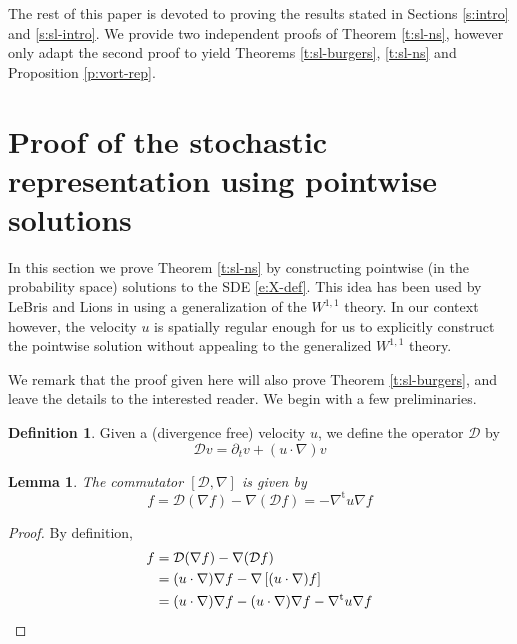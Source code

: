 \documentclass[final]{amsart}%
\newcommand{\del}{\partial}
\newcommand{\transpose}{^\text{t}}
\newcommand{\grad}{\nabla}
\newcommand{\gradt}{\grad\transpose}
\newcommand{\Dzero}[2][u]{\del_t #2 + \left(#1 \cdot \grad\right) #2}
\newcommand{\Dop}{\mathcal{D}}
\numberwithin{equation}{section}
\newtheorem{lemma}[theorem]{Lemma}
\theoremstyle{definition}
\newtheorem{defn}[theorem]{Definition}
\theoremstyle{remark}
\begin{document}
The rest of this paper is devoted to proving the results stated in Sections \ref{s:intro} and \ref{s:sl-intro}. We provide two independent proofs of Theorem \ref{t:sl-ns}, however only adapt the second proof to yield Theorems \ref{t:sl-burgers}, \ref{t:sl-ns} and Proposition \ref{p:vort-rep}.

\section{Proof of the stochastic representation using pointwise solutions}\label{s:ode-proof}%

In this section we prove Theorem \ref{t:sl-ns} by constructing pointwise (in the probability space) solutions to the SDE \eqref{e:X-def}. This idea has been used by LeBris and Lions in \cite{lebris} using a generalization of the $W^{1,1}$ theory. In our context however, the velocity $u$ is spatially regular enough for us to explicitly construct the pointwise solution without appealing to the generalized $W^{1,1}$ theory.

We remark that the proof given here will also prove Theorem \ref{t:sl-burgers}, and leave the details to the interested reader. We begin with a few preliminaries.

\begin{defn}%
Given a (divergence free) velocity $u$, we define the operator $\Dop$ by
\begin{equation*}
\Dop v = \Dzero{v}
\end{equation*}
\end{defn}

\begin{lemma}%
The commutator $[\Dop, \grad]$ is given by
\begin{equation*}
[\Dop, \grad] f = \Dop (\grad f) - \grad( \Dop f) = -\gradt u \grad f
\end{equation*}
\end{lemma}

\begin{proof}%
By definition,
\begin{align*}
[\Dop, \grad] f &= \Dop (\grad f) - \grad( \Dop f) \\
    &= (u \cdot \grad) \grad f - \grad\left[ (u \cdot \grad) f \right]\\
    &= (u \cdot \grad) \grad f - (u \cdot \grad) \grad f - \gradt u \grad f \qedhere
\end{align*}
\end{proof}
\end{document}
